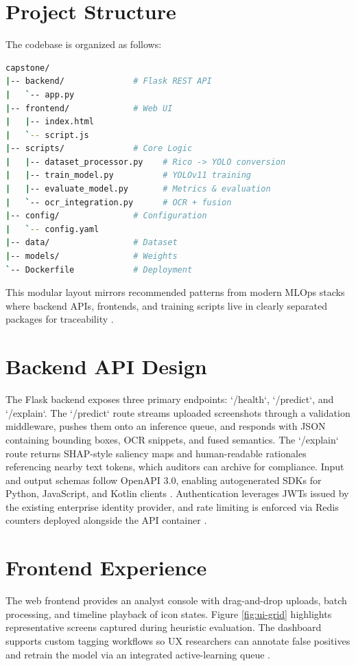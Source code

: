 \documentclass[11pt,a4paper]{report}
\begin{document}
\section{Project Structure}
The codebase is organized as follows:
\begin{lstlisting}[language=bash]
capstone/
|-- backend/              # Flask REST API
|   `-- app.py
|-- frontend/             # Web UI
|   |-- index.html
|   `-- script.js
|-- scripts/              # Core Logic
|   |-- dataset_processor.py    # Rico -> YOLO conversion
|   |-- train_model.py          # YOLOv11 training
|   |-- evaluate_model.py       # Metrics & evaluation
|   `-- ocr_integration.py      # OCR + fusion
|-- config/               # Configuration
|   `-- config.yaml
|-- data/                 # Dataset
|-- models/               # Weights
`-- Dockerfile            # Deployment
\end{lstlisting}
This modular layout mirrors recommended patterns from modern MLOps stacks where backend APIs, frontends, and training scripts live in clearly separated packages for traceability \cite{docker}\cite{pytorch}.

\section{Backend API Design}
The Flask backend exposes three primary endpoints: `/health`, `/predict`, and `/explain`. The `/predict` route streams uploaded screenshots through a validation middleware, pushes them onto an inference queue, and responds with JSON containing bounding boxes, OCR snippets, and fused semantics. The `/explain` route returns SHAP-style saliency maps and human-readable rationales referencing nearby text tokens, which auditors can archive for compliance. Input and output schemas follow OpenAPI 3.0, enabling autogenerated SDKs for Python, JavaScript, and Kotlin clients \cite{uiautomation}. Authentication leverages JWTs issued by the existing enterprise identity provider, and rate limiting is enforced via Redis counters deployed alongside the API container \cite{docker}.

\section{Frontend Experience}
The web frontend provides an analyst console with drag-and-drop uploads, batch processing, and timeline playback of icon states. Figure \ref{fig:ui-grid} highlights representative screens captured during heuristic evaluation. The dashboard supports custom tagging workflows so UX researchers can annotate false positives and retrain the model via an integrated active-learning queue \cite{multimodalaccessibility}.
\end{document}
